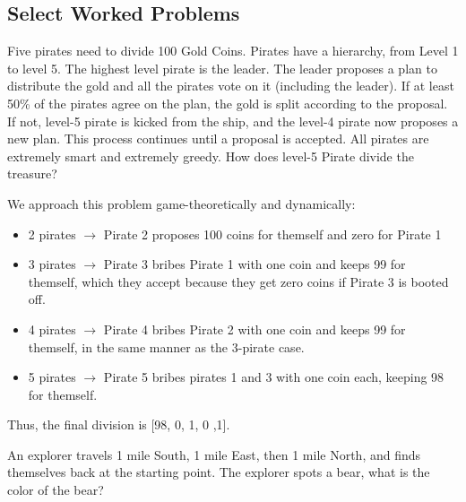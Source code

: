 \subsection{Select Worked Problems}

\begin{problem}[Easy]
Five pirates need to divide 100 Gold Coins. Pirates have a hierarchy, from Level 1 to level 5. The highest level pirate is the leader. The leader proposes a plan to distribute the gold and all the pirates vote on it (including the leader). If at least 50\% of the pirates agree on the plan, the gold is split according to the proposal. If not, level-5 pirate is kicked from the ship, and the level-4 pirate now proposes a new plan. This process continues until a proposal is accepted. All pirates are extremely smart and extremely greedy. How does level-5 Pirate divide the treasure?
\end{problem}

\begin{solution}
We approach this problem game-theoretically and dynamically:
\begin{itemize}[label=$\circ$]
    \item 2 pirates $\rightarrow$ Pirate 2 proposes 100 coins for themself and zero for Pirate 1
    \item 3 pirates $\rightarrow$ Pirate 3 bribes Pirate 1 with one coin and keeps 99 for themself, which they accept because they get zero coins if Pirate 3 is booted off.
    \item 4 pirates $\rightarrow$ Pirate 4 bribes Pirate 2 with one coin and keeps 99 for themself, in the same manner as the 3-pirate case.
    \item 5 pirates $\rightarrow$ Pirate 5 bribes pirates 1 and 3 with one coin each, keeping 98 for themself.
\end{itemize}

\begin{center}
Thus, the final division is [98, 0, 1, 0 ,1].
\end{center}

\end{solution}


\begin{problem}[Easy]
An explorer travels 1 mile South, 1 mile East, then 1 mile North, and finds themselves back at the starting point. The explorer spots a bear, what is the color of the bear?
\end{problem}

